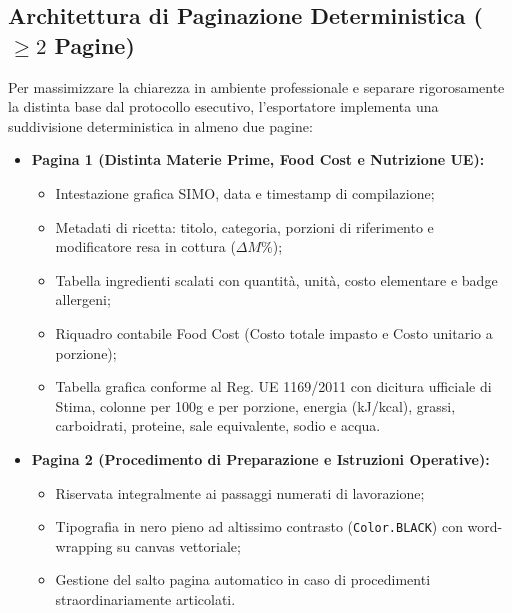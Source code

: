 \documentclass[11pt,a4paper,titlepage]{article}
\begin{document}
\subsection{Architettura di Paginazione Deterministica ($\ge 2$ Pagine)}
Per massimizzare la chiarezza in ambiente professionale e separare rigorosamente la distinta base dal protocollo esecutivo, l'esportatore implementa una suddivisione deterministica in almeno due pagine:
\begin{itemize}[leftmargin=*]
    \item \textbf{Pagina 1 (Distinta Materie Prime, Food Cost e Nutrizione UE):}
    \begin{itemize}[noitemsep]
        \item Intestazione grafica SIMO, data e timestamp di compilazione;
        \item Metadati di ricetta: titolo, categoria, porzioni di riferimento e modificatore resa in cottura ($\Delta M\%$);
        \item Tabella ingredienti scalati con quantit\`a, unit\`a, costo elementare e badge allergeni;
        \item Riquadro contabile Food Cost (Costo totale impasto e Costo unitario a porzione);
        \item Tabella grafica conforme al Reg. UE 1169/2011 con dicitura ufficiale di Stima, colonne per 100g e per porzione, energia (kJ/kcal), grassi, carboidrati, proteine, sale equivalente, sodio e acqua.
    \end{itemize}
    \item \textbf{Pagina 2 (Procedimento di Preparazione e Istruzioni Operative):}
    \begin{itemize}[noitemsep]
        \item Riservata integralmente ai passaggi numerati di lavorazione;
        \item Tipografia in nero pieno ad altissimo contrasto (\texttt{Color.BLACK}) con word-wrapping su canvas vettoriale;
        \item Gestione del salto pagina automatico in caso di procedimenti straordinariamente articolati.
    \end{itemize}
\end{itemize}
\end{document}
